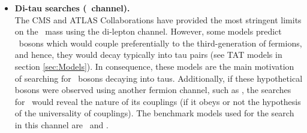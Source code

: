 \begin{itemize}

\item \textbf{Di-tau searches (\Zprimetotautau~channel).}\\

\noindent The CMS and ATLAS Collaborations have provided the most stringent limits on 
the \Zprime~mass using the di-lepton channel. However, some models predict 
\Zprime~bosons which would couple preferentially to the third-generation of fermions, and hence, 
they would decay typically into tau pairs (see TAT models in section \ref{sec:Models}). In 
consequence, these models are the main motivation of searching for \Zprime~bosons decaying into taus. 
Additionally, if these hypothetical bosons were observed using another fermion channel, such as \Zprimetoll, 
the searches for \Zprimetotautau~would reveal the nature of its couplings (if it 
obeys or not the hypothesis of the universality of couplings). The benchmark models used 
for the search in this channel are \ZprimeSSM~and \ZprimeTAT. \\


\end{itemize}
